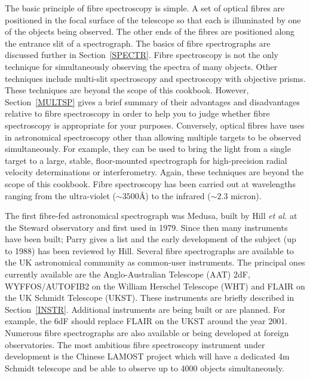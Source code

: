 \documentclass[twoside,11pt]{article}
\begin{document}
The basic principle of fibre spectroscopy is simple.  A set of optical
fibres are positioned in the focal surface of the telescope so that
each is illuminated by one of the objects being observed.  The other
ends of the fibres are positioned along the entrance slit of a
spectrograph.  The basics of fibre spectrographs are discussed further in
Section~\ref{SPECTR}.  Fibre spectroscopy is not the only technique for
simultaneously observing the spectra of many objects.  Other techniques
include multi-slit spectroscopy and spectroscopy with objective prisms.
These techniques are beyond the scope of this cookbook.  However,
Section~\ref{MULTSP} gives a brief summary of their advantages and
disadvantages relative to fibre spectroscopy in order to help you to
judge whether fibre spectroscopy is appropriate for your purposes.
Conversely, optical fibres have uses in astronomical spectroscopy other
than allowing multiple targets to be observed simultaneously.  For
example, they can be used to bring the light from a single target to a
large, stable, floor-mounted spectrograph for high-precision radial
velocity determinations or interferometry.  Again, these techniques are
beyond the scope of this cookbook.  Fibre spectroscopy has been carried
out at wavelengths ranging from the ultra-violet ($\sim 3500$\AA) to
the infrared ($\sim 2.3$ micron).

The first fibre-fed astronomical spectrograph was Medusa, built by
Hill {\it et al.}\/\cite{HILL80} at the Steward observatory and first
used in 1979.  Since then many instruments have been built;
Parry\cite{PARRY97} gives a list and the early development of the
subject (up to 1988) has been reviewed by Hill\cite{HILL88}.  Several
fibre spectrographs are available to the UK astronomical community
as common-user instruments.  The principal ones currently available are
the Anglo-Australian Telescope (AAT) 2dF, WYFFOS/AUTOFIB2 on the William
Herschel Telescope (WHT) and FLAIR on the UK Schmidt Telescope (UKST).
These instruments are briefly described in Section~\ref{INSTR}.
Additional instruments are being built or are planned.  For example, the
6dF\cite{PARKER98} should replace FLAIR on the UKST around the year
2001.  Numerous fibre spectrographs are also available or being
developed at foreign observatories.  The most ambitious fibre
spectroscopy instrument under development is the Chinese LAMOST
project\cite{CHU97} which will have a dedicated 4m Schmidt
telescope and be able to observe up to 4000 objects simultaneously.
\end{document}
